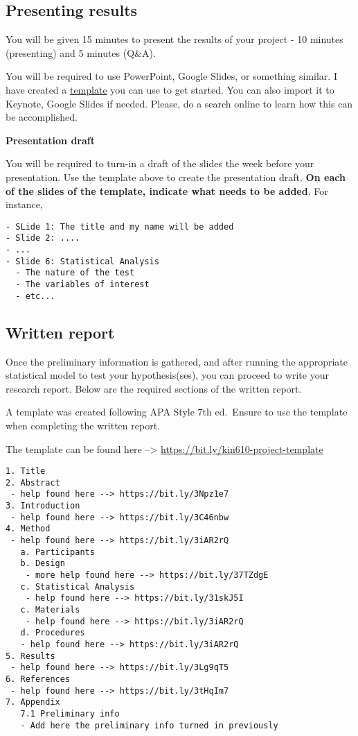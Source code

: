 \documentclass[
]{article}
\begin{document}
\hypertarget{presenting-results}{%
\subsection{Presenting results}\label{presenting-results}}

You will be given 15 minutes to present the results of your project - 10 minutes (presenting) and 5 minutes (Q\&A).

You will be required to use PowerPoint, Google Slides, or something similar. I have created a \href{pres-template.html}{template} you can use to get started. You can also import it to Keynote, Google Slides if needed. Please, do a search online to learn how this can be accomplished.

\textbf{Presentation draft}

You will be required to turn-in a draft of the slides the week before your presentation. Use the template above to create the presentation draft. \textbf{On each of the slides of the template, indicate what needs to be added}. For instance,

\begin{verbatim}
- SLide 1: The title and my name will be added
- Slide 2: ....
- ...
- Slide 6: Statistical Analysis
  - The nature of the test
  - The variables of interest
  - etc...
\end{verbatim}

\hypertarget{written-report}{%
\subsection{Written report}\label{written-report}}

Once the preliminary information is gathered, and after running the appropriate statistical model to test your hypothesis(ses), you can proceed to write your research report. Below are the required sections of the written report.

A template was created following APA Style 7th ed.~Ensure to use the template when completing the written report.

The template can be found here --\textgreater{} \url{https://bit.ly/kin610-project-template}

\begin{verbatim}
1. Title
2. Abstract
 - help found here --> https://bit.ly/3Npz1e7
3. Introduction
 - help found here --> https://bit.ly/3C46nbw
4. Method 
 - help found here --> https://bit.ly/3iAR2rQ
   a. Participants
   b. Design
    - more help found here --> https://bit.ly/37TZdgE
   c. Statistical Analysis
    - help found here --> https://bit.ly/31skJ5I 
   c. Materials
    - help found here --> https://bit.ly/3iAR2rQ
   d. Procedures
   - help found here --> https://bit.ly/3iAR2rQ
5. Results
 - help found here --> https://bit.ly/3Lg9qT5
6. References
 - help found here --> https://bit.ly/3tHqIm7
7. Appendix
   7.1 Preliminary info
   - Add here the preliminary info turned in previously
\end{verbatim}
\end{document}
